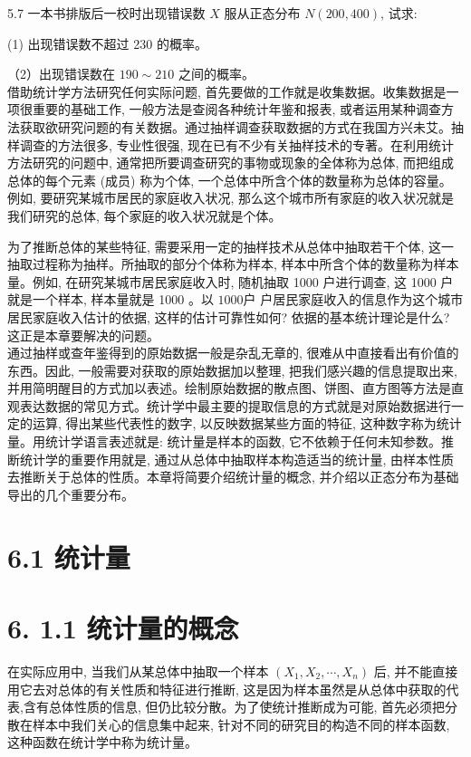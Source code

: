 \documentclass[10pt]{article}
\begin{document}
\begin{CJK*}{UTF8}{bsmi}
5.7 一本书排版后一校时出现错误数 $X$ 服从正态分布 $N(200,400)$, 试求:

(1) 出现错误数不超过 230 的概率。

（2）出现错误数在 $190 \sim 210$ 之间的概率。\\

借助统计学方法研究任何实际问题, 首先要做的工作就是收集数据。收集数据是一项很重要的基础工作, 一般方法是查阅各种统计年鉴和报表, 或者运用某种调查方法获取欲研究问题的有关数据。通过抽样调查获取数据的方式在我国方兴未艾。抽样调查的方法很多, 专业性很强, 现在已有不少有关抽样技术的专著。在利用统计方法研究的问题中, 通常把所要调查研究的事物或现象的全体称为总体, 而把组成总体的每个元素 (成员) 称为个体, 一个总体中所含个体的数量称为总体的容量。例如, 要研究某城市居民的家庭收入状况, 那么这个城市所有家庭的收入状况就是我们研究的总体, 每个家庭的收入状况就是个体。

为了推断总体的某些特征, 需要采用一定的抽样技术从总体中抽取若干个体, 这一抽取过程称为抽样。所抽取的部分个体称为样本, 样本中所含个体的数量称为样本量。例如, 在研究某城市居民家庭收入时, 随机抽取 1000 户进行调查, 这 1000 户就是一个样本, 样本量就是 1000 。以 $1000 户$ 户居民家庭收入的信息作为这个城市居民家庭收入估计的依据, 这样的估计可靠性如何? 依据的基本统计理论是什么? 这正是本章要解决的问题。\\
通过抽样或查年鉴得到的原始数据一般是杂乱无章的, 很难从中直接看出有价值的东西。因此, 一般需要对获取的原始数据加以整理, 把我们感兴趣的信息提取出来, 并用简明醒目的方式加以表述。绘制原始数据的散点图、饼图、直方图等方法是直观表达数据的常见方式。统计学中最主要的提取信息的方式就是对原始数据进行一定的运算, 得出某些代表性的数字, 以反映数据某些方面的特征, 这种数字称为统计量。用统计学语言表述就是: 统计量是样本的函数, 它不依赖于任何未知参数。推断统计学的重要作用就是, 通过从总体中抽取样本构造适当的统计量, 由样本性质去推断关于总体的性质。本章将简要介绍统计量的概念, 并介绍以正态分布为基础导出的几个重要分布。

\section*{6.1 统计量}
\section*{6. 1.1 统计量的概念}
在实际应用中, 当我们从某总体中抽取一个样本 $\left(X_{1}, X_{2}, \cdots, X_{n}\right)$ 后, 并不能直接用它去对总体的有关性质和特征进行推断, 这是因为样本虽然是从总体中获取的代表,含有总体性质的信息, 但仍比较分散。为了使统计推断成为可能, 首先必须把分散在样本中我们关心的信息集中起来, 针对不同的研究目的构造不同的样本函数, 这种函数在统计学中称为统计量。


\end{CJK*}
\end{document}
